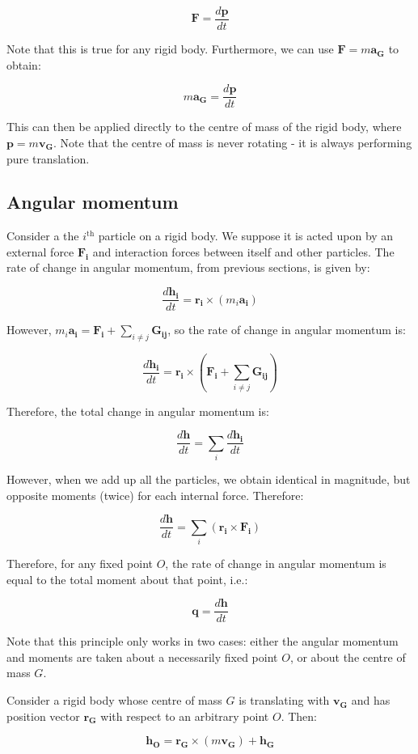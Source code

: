 \documentclass[12pt]{article}
\begin{document}
\[ \mathbf{F} = \frac{d\mathbf{p}}{dt} \]

Note that this is true for any rigid body. Furthermore, we can use $\mathbf{F} = m\mathbf{a_G}$ to obtain:

\[ m\mathbf{a_G} = \frac{d\mathbf{p}}{dt} \]

This can then be applied directly to the centre of mass of the rigid body, where $\mathbf{p} = m\mathbf{v_G}$. Note that the centre of mass is never rotating - it is always performing pure translation.

\subsection{Angular momentum}

Consider a the $i^{\text{th}}$ particle on a rigid body. We suppose it is acted upon by an external force $\mathbf{F_i}$ and interaction forces between itself and other particles. The rate of change in angular momentum, from previous sections, is given by:

\[ \frac{d\mathbf{h_i}}{dt} = \mathbf{r_i} \times (m_i\mathbf{a_i}) \]

However, $m_i\mathbf{a_i} = \mathbf{F_i} + \sum_{i \neq j} \mathbf{G_{ij}}$, so the rate of change in angular momentum is:

\[ \frac{d\mathbf{h_i}}{dt} = \mathbf{r_i} \times \left(\mathbf{F_i} + \sum_{i \neq j}\mathbf{G_{ij}}\right)\]

Therefore, the total change in angular momentum is:

\[ \frac{d\mathbf{h}}{dt} = \sum_i \frac{d\mathbf{h_i}}{dt} \]

However, when we add up all the particles, we obtain identical in magnitude, but opposite moments (twice) for each internal force. Therefore:

\[ \frac{d\mathbf{h}}{dt} = \sum_i (\mathbf{r_i} \times \mathbf{F_i}) \]

Therefore, for any fixed point $O$, the rate of change in angular momentum is equal to the total moment about that point, i.e.:

\[ \mathbf{q} = \frac{d\mathbf{h}}{dt} \]

Note that this principle only works in two cases: either the angular momentum and moments are taken about a necessarily fixed point $O$, or about the centre of mass $G$.

\begin{theorem}
    Consider a rigid body whose centre of mass $G$ is translating with $\mathbf{v_G}$ and has position vector $\mathbf{r_G}$ with respect to an arbitrary point $O$. Then:

    \[ \mathbf{h_O} = \mathbf{r_G} \times (m\mathbf{v_G}) + \mathbf{h_G} \]
\end{theorem}
\end{document}
